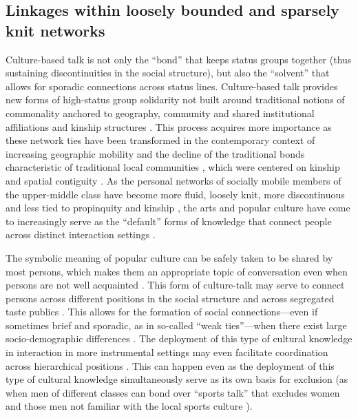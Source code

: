 \documentclass[11pt]{article}
\begin{document}
\subsection{Linkages within loosely bounded and sparsely knit networks}
Culture-based talk is not only  the ``bond'' that keeps status groups together (thus sustaining discontinuities in the social structure), but also the ``solvent'' that allows for sporadic connections across status lines.  Culture-based talk provides new forms of high-status group solidarity not built around traditional notions of commonality anchored to geography, community and shared institutional affiliations and kinship structures \citep{holt98}. This process acquires more importance as these network ties have been transformed in the contemporary context of increasing geographic mobility \citep{griswold_wright04} and the decline of the traditional bonds characteristic of traditional local communities \citep{wellman79}, which were centered on kinship and spatial contiguity \citep{dimaggio_mohr85}.  As the personal networks of socially mobile members of the upper-middle class have become more fluid, loosely knit, more discontinuous and less tied to propinquity and kinship \citep{meyrowitz85, wellman_wortley90, wellman_etal88}, the arts and popular culture have come to increasingly serve as the ``default'' forms of knowledge that connect people across distinct interaction settings \citep{dimaggio87}.

The symbolic meaning  of popular culture can be safely taken to be shared by most persons, which makes them an appropriate topic of conversation even when persons are not well acquainted  \citep[460-461]{fine77}. This form of culture-talk may serve to connect persons across different positions in the social structure and across segregated taste publics \cite{ikegami05, mische10}.   This allows for the formation of social connections---even if sometimes brief and sporadic, as in so-called ``weak ties''---when there exist large socio-demographic differences \citep{lizardo06a}.  The deployment of this type of cultural knowledge in interaction in more instrumental settings may even facilitate coordination across hierarchical positions \citep{erickson96}. This can happen even as the deployment of this type of cultural knowledge simultaneously serve as its own basis for exclusion (as when men of different classes can bond over ``sports talk'' that excludes women and those men not familiar with the local sports culture \citep{erickson96, purcell07, pachuki_breiger10}).  
\end{document}
